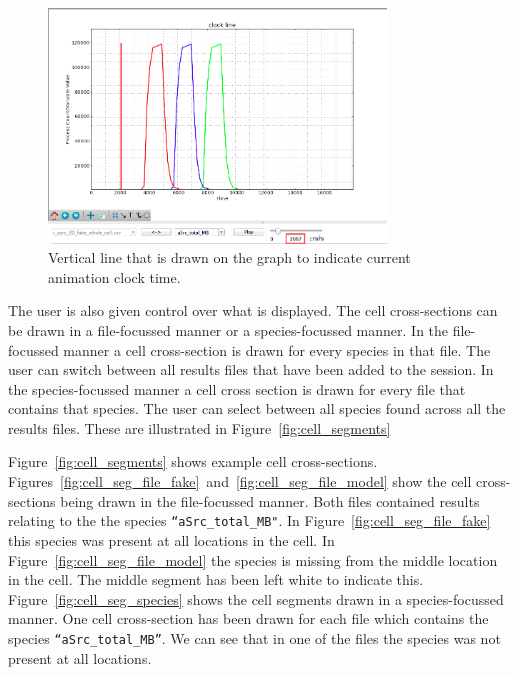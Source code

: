 \begin{figure}[h!]
    \centering
    \includegraphics[width=0.8\textwidth]{images/animation_clock_line.png}
    \caption{Vertical line that is drawn on the graph to indicate current animation clock time.}
    \label{fig:animation_clock}
\end{figure}

The user is also given control over what is displayed.  The cell cross-sections can be drawn in a file-focussed manner or a species-focussed manner.  In the file-focussed manner a cell cross-section is drawn for every species in that file.  The user can switch between all results files that have been added to the session.  In the species-focussed manner a cell cross section is drawn for every file that contains that species.  The user can select between all species found across all the results files.  These are illustrated in Figure~\ref{fig:cell_segments}

Figure~\ref{fig:cell_segments} shows example cell cross-sections.  Figures~\ref{fig:cell_seg_file_fake}~and~\ref{fig:cell_seg_file_model} show the cell cross-sections being drawn in the file-focussed manner.  Both files contained results relating to the the species \texttt{``aSrc\_total\_MB"}. In Figure~\ref{fig:cell_seg_file_fake} this species was present at all locations in the cell.  In Figure~\ref{fig:cell_seg_file_model} the species is missing from the middle location in the cell.  The middle segment has been left white to indicate this.  Figure~\ref{fig:cell_seg_species} shows the cell segments drawn in a species-focussed manner.  One cell cross-section has been drawn for each file which contains the species \texttt{``aSrc\_total\_MB''}.  We can see that in one of the files the species was not present at all locations.

